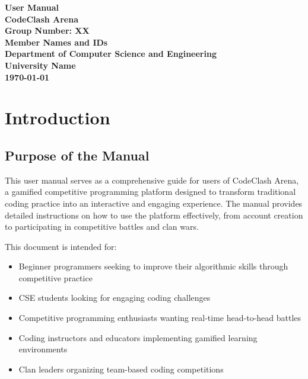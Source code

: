 \documentclass[12pt,a4paper]{article}
\begin{document}
\begin{titlepage}
\centering

\vspace*{2cm}

{\Huge \textbf{User Manual}}\\[0.5cm]
{\LARGE \textbf{CodeClash Arena}}\\[2cm]

\textbf{Group Number: XX}\\[0.5cm]
\textbf{Member Names and IDs}\\[3cm]

\textbf{Department of Computer Science and Engineering}\\
\textbf{University Name}\\[1cm]

\textbf{\today}

\vfill
\end{titlepage}

\tableofcontents
\newpage

\section{Introduction}

\subsection{Purpose of the Manual}

This user manual serves as a comprehensive guide for users of CodeClash Arena, a gamified competitive programming platform designed to transform traditional coding practice into an interactive and engaging experience. The manual provides detailed instructions on how to use the platform effectively, from account creation to participating in competitive battles and clan wars.

This document is intended for:
\begin{itemize}
\item Beginner programmers seeking to improve their algorithmic skills through competitive practice
\item CSE students looking for engaging coding challenges
\item Competitive programming enthusiasts wanting real-time head-to-head battles
\item Coding instructors and educators implementing gamified learning environments
\item Clan leaders organizing team-based coding competitions
\end{itemize}
\end{document}
